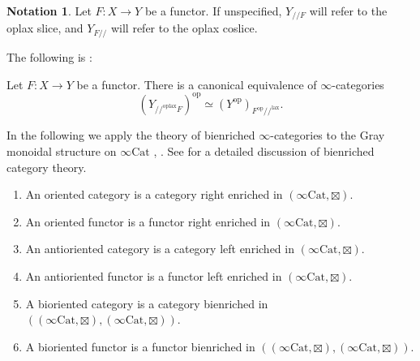 \documentclass[10pt,oneside]{article}
\numberwithin{equation}{section} %
\numberwithin{figure}{section} %
\theoremstyle{plain}
\theoremstyle{definition}
\newtheorem{notation}[thm]{Notation}
\newcommand{\op}{\mathrm{op}}
\newcommand{\Cat}{\mathrm{Cat}}
\newcommand{\lax}{{\mathrm{lax}}}
\newcommand{\oplax}{{\mathrm{oplax}}}
\begin{document}
\begin{notation}Let $F: X \to Y $ be a functor.
If unspecified, $Y_{//F}$ will refer to the oplax slice, and $Y_{F//}$ will refer to the oplax coslice.
\end{notation}

The following is \cite[Lemma 3.7.13]{GepnerHeine2026}:

\begin{lemma}Let $F: X \to Y $ be a functor.
There is a canonical equivalence of $\infty$-categories
$$ (Y_{//^\oplax F})^\op \simeq (Y^\op)_{F^\op//^\lax }.$$
\end{lemma}


In the following we apply the theory of bienriched $\infty$-categories to the Gray monoidal structure on $\infty\Cat$ \cite{oriented}, \cite{heine2026stable}.
See \cite{heine2024bienriched} for a detailed discussion of bienriched category theory.


\begin{definition}
\begin{enumerate}[\normalfont(1)]\setlength{\itemsep}{-2pt}
\item An oriented category is a category right enriched in $(\infty\Cat,\boxtimes).$

\item An oriented functor is a functor right enriched in $(\infty\Cat,\boxtimes).$

\item An antioriented category is a category left enriched in $(\infty\Cat,\boxtimes).$

\item An antioriented functor is a functor left enriched in $(\infty\Cat,\boxtimes).$

\item A bioriented category is a category bienriched in  $((\infty\Cat,\boxtimes), (\infty\Cat,\boxtimes))$.

\item A bioriented functor is a functor bienriched in  $((\infty\Cat,\boxtimes), (\infty\Cat,\boxtimes))$.

\end{enumerate}

\end{definition}
\end{document}
